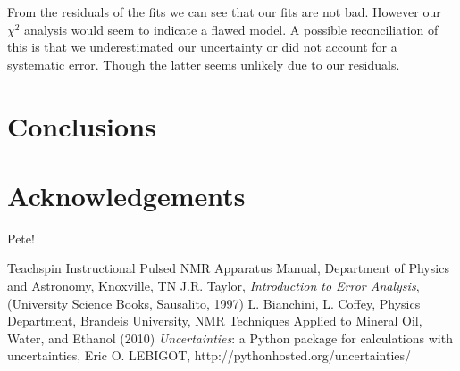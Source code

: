 \documentclass[11pt,letterpaper]{article}
\begin{document}
From the residuals of the fits we can see that our fits are not bad. However our $\chi^2$ analysis would seem to indicate a flawed model. A possible reconciliation of this is that we underestimated our uncertainty or did not account for a systematic error. Though the latter seems unlikely due to our residuals.

\section{Conclusions}
\section{Acknowledgements}
Pete!

\begin{thebibliography}{99}
 Teachspin Instructional Pulsed NMR Apparatus Manual, Department of Physics and Astronomy, Knoxville, TN
 J.R. Taylor, {\it Introduction to Error Analysis}, (University Science Books, Sausalito, 1997)
 L. Bianchini, L. Coffey, Physics Department, Brandeis University, NMR Techniques Applied to Mineral Oil, Water, and Ethanol (2010)
 {\it Uncertainties}: a Python package for calculations with uncertainties, Eric O. LEBIGOT, http://pythonhosted.org/uncertainties/

\end{thebibliography}
\end{document}
